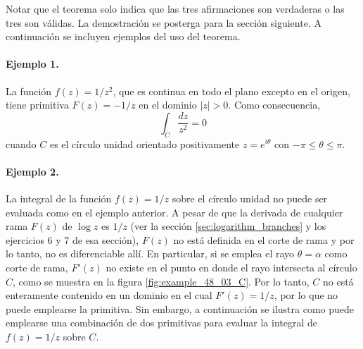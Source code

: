 \documentclass[a4paper]{report}
\begin{document}
Notar que el teorema solo indica que las tres afirmaciones son verdaderas o las tres son válidas. La demostración se posterga para la sección siguiente. A continuación se incluyen ejemplos del uso del teorema.

\paragraph{Ejemplo 1.} La función \(f(z)=1/z^2\), que es continua en todo el plano excepto en el origen, tiene primitiva \(F(z)=-1/z\) en el dominio \(|z|>0\). Como consecuencia,
\[
 \int_C\frac{dz}{z^2}=0
\]
cuando \(C\) es el círculo unidad orientado positivamente \(z=e^{i\theta}\) con \(-\pi\leq\theta\leq\pi\).  

\paragraph{Ejemplo 2.} La integral de la función \(f(z)=1/z\) sobre el círculo unidad no puede ser evaluada como en el ejemplo anterior. A pesar de que la derivada de cualquier rama \(F(z)\) de \(\log z\) es \(1/z\) (ver la sección \ref{sec:logarithm_branches} y los ejercicios 6 y 7 de esa sección), \(F(z)\) no está definida en el corte de rama y por lo tanto, no es diferenciable allí. En particular, si se emplea el rayo \(\theta=\alpha\) como corte de rama, \(F'(z)\) no existe en el punto en donde el rayo intersecta al círculo \(C\), como se muestra en la figura \ref{fig:example_48_03_C}. Por lo tanto, \(C\) no está enteramente contenido en un dominio en el cual \(F'(z)=1/z\), por lo que no puede emplearse la primitiva. Sin embargo, a continuación se ilustra como puede emplearse una combinación de dos primitivas para evaluar la integral de \(f(z)=1/z\) sobre \(C\). 
\end{document}
